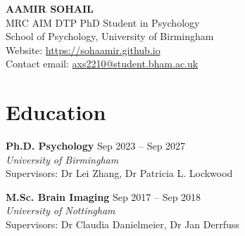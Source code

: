 \documentclass[a4paper,10pt]{article}
\begin{document}
\begin{center}
    \textbf{\Huge \scshape AAMIR SOHAIL} \\ \vspace{8pt}
    MRC AIM DTP PhD Student in Psychology \\ \vspace{1pt}
    School of Psychology, University of Birmingham \\ \vspace{1pt}
    Website: \href{https://sohaamir.github.io}{\color{linkcolor}https://sohaamir.github.io} \\ \vspace{1pt}
    Contact email: \href{mailto:axs2210@bham.ac.uk}{\color{linkcolor}axs2210@student.bham.ac.uk}
\end{center}

\section{Education}
\vspace{2pt}
\begin{adjustwidth}{0em}{0pt}
\textbf{Ph.D. Psychology} \hfill {Sep 2023 -- Sep 2027} \\
\emph{University of Birmingham} \\
Supervisors: Dr Lei Zhang, Dr Patricia L. Lockwood
\end{adjustwidth}

\vspace{8pt} %

\begin{adjustwidth}{0em}{0pt}
\textbf{M.Sc. Brain Imaging} \hfill{Sep 2017 -- Sep 2018} \\
\emph{University of Nottingham} \\
Supervisors: Dr Claudia Danielmeier, Dr Jan Derrfuss
\end{adjustwidth}

\vspace{8pt}
\end{document}
